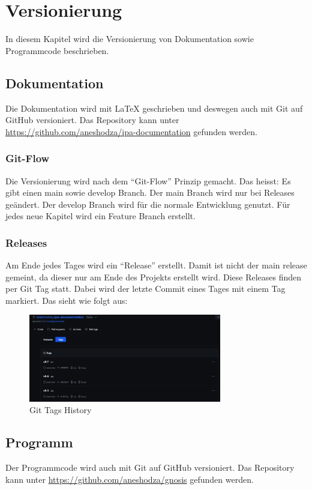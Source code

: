 \section{Versionierung}
\label{sec:versioning}
In diesem Kapitel wird die Versionierung von Dokumentation sowie Programmcode beschrieben.
\subsection{Dokumentation}
Die Dokumentation wird mit LaTeX geschrieben und deswegen auch mit Git auf GitHub versioniert. Das
Repository kann unter \url{https://github.com/aneshodza/ipa-documentation} gefunden werden.
\subsubsection{Git-Flow}
Die Versionierung wird nach dem \enquote{Git-Flow} Prinzip gemacht. Das heisst: Es gibt einen main sowie
develop Branch. Der main Branch wird nur bei Releases geändert. Der develop Branch wird für die normale
Entwicklung genutzt. Für jedes neue Kapitel wird ein Feature Branch erstellt.

\newpage
\subsubsection{Releases}
Am Ende jedes Tages wird ein \enquote{Release} erstellt. Damit ist nicht der main release gemeint, da dieser
nur am Ende des Projekts erstellt wird. Diese Releases finden per Git Tag statt. Dabei wird der letzte
Commit eines Tages mit einem Tag markiert. Das sieht wie folgt aus:
\begin{figure}[H]
    \centering
    \includegraphics[width=0.75\textwidth]{images/misc/git_tag.png}
    \caption[Ein Screenshot der genutzten Git Tag History für die Versionierung]{Git Tags History}
    \label{fig:git_tag}
\end{figure}

\subsection{Programm}
Der Programmcode wird auch mit Git auf GitHub versioniert. Das Repository kann unter
\url{https://github.com/aneshodza/gnosis} gefunden werden.
